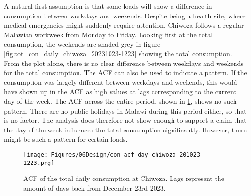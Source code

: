 A natural first assumption is that some loads will show a difference in consumption between workdays and weekends. Despite being a health site, where medical emergencies might suddenly require attention, Chiwoza follows a regular Malawian workweek from Monday to Friday. Looking first at the total consumption, the weekends are shaded grey in figure \ref{fig:tot_con_daily_chiwoza_20231023-1223} showing the total consumption. From the plot alone, there is no clear difference between weekdays and weekends for the total consumption. The ACF can also be used to indicate a pattern. If the consumption was largely different between weekdays and weekends, this would have shown up in the ACF as high values at lags corresponding to the current day of the week. The ACF across the entire period, shown in \ref{fig:con_acf_day_chiwoza_201023-1223}, shows no such pattern. There are no public holidays in Malawi during this period either, so that is no factor. The analysis does therefore not show enough to support a claim that the day of the week influences the total consumption significantly. However, there might be such a pattern for certain loads. \\

\begin{figure}[h]
    \centering
    \texttt{[image: Figures/06Design/con\_acf\_day\_chiwoza\_201023-1223.png]}
    \caption[ACF Daily consumption Chiwoza 20231023-1223]{ACF of the total daily consumption at Chiwoza. Lags represent the amount of days back from December 23rd 2023.}
    \label{fig:con_acf_day_chiwoza_201023-1223}
\end{figure}

